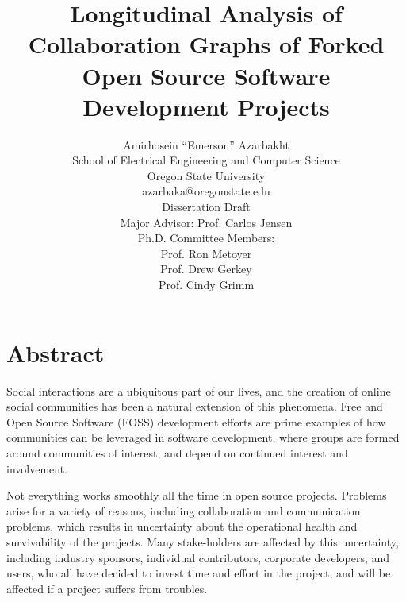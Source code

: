 \documentclass[12pt]{report}
\begin{document}
\title{Longitudinal Analysis of Collaboration Graphs of Forked Open Source Software Development Projects}

\author{Amirhosein ``Emerson'' Azarbakht\\
School of Electrical Engineering and Computer Science\\
Oregon State University\\
\vspace{5mm} %
azarbaka@oregonstate.edu\\
\vspace{5mm} %
Dissertation Draft\\
Major Advisor: Prof. Carlos Jensen\\
Ph.D. Committee Members:\\
Prof. Ron Metoyer\\
Prof. Drew Gerkey\\
Prof. Cindy Grimm\\
}

\maketitle

\tableofcontents

\thispagestyle{empty}
\listoffigures
\listoftables

\pagebreak

\section{Abstract}

Social interactions are a ubiquitous part of our lives, and the creation of online social communities has been a natural extension of this phenomena. Free and Open Source Software (FOSS) development efforts are prime examples of how communities can be leveraged in software development, where groups are formed around communities of interest, and depend on continued interest and involvement.

Not everything works smoothly all the time in open source projects. Problems arise for a variety of reasons, including collaboration and communication problems, which results in uncertainty about the operational health and survivability of the projects. Many stake-holders are affected by this uncertainty, including industry sponsors, individual contributors, corporate developers, and users, who all have decided to invest time and effort in the project, and will be affected if a project suffers from troubles.
\end{document}

